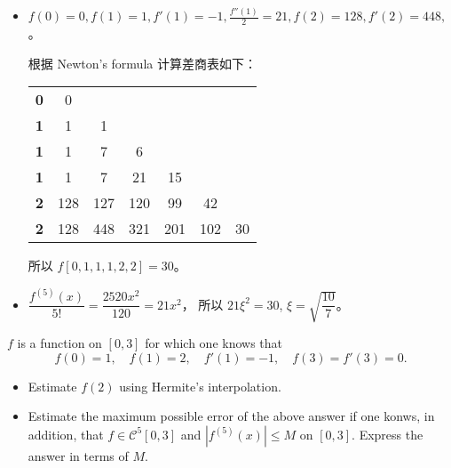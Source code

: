 \documentclass[lang=cn,a4paper,newtx,bibend=bibtex]{elegantpaper}
\begin{document}
\begin{solution}
  \begin{itemize}
  \item $f(0) = 0, f(1) = 1, f'(1) = -1, \frac{f''(1)}{2} = 21, f(2) = 128, f'(2) = 448,$。

  根据 Newton's formula 计算差商表如下：
  \begin{tabular}{c|cccccc}
     &  &  &  &  & & \\
    \hline
    \textbf{0} & 0 & & & & &\\
    \textbf{1} & 1 & 1 & & & & \\
    \textbf{1} & 1 & 7 & 6 & & &\\
    \textbf{1} & 1 & 7 & 21 & 15 & & \\
    \textbf{2} & 128 & 127 & 120 & 99 & 42 \\
    \textbf{2} & 128 & 448 & 321 & 201 & 102& 30  \\
    \end{tabular}
  
  
  所以  $f[0, 1, 1, 1, 2, 2]  = 30$。
  
  \item $\dfrac{f^{(5)}(x)}{5!} = \dfrac{2520x^2}{120} = 21x^2$， 所以 $21\xi^2 = 30$, $\xi = \sqrt{\dfrac{10}{7}}$。
  \end{itemize}
  \end{solution}

\begin{prob}[2.9.1-\textrm{VI}.]
    $f$ is a function on $[0,3]$ for which one knows that
    \begin{equation*}
      f(0)=1,\quad f(1)=2,\quad f'(1)=-1,\quad f(3)=f'(3)=0.
    \end{equation*}
    \begin{itemize}
      \item Estimate $f(2)$ using Hermite's interpolation.
      \item Estimate the maximum possible error of the above answer if one konws, in addition, that $f\in \mathcal{C}^5[0,3]$ and $|f^{(5)}(x)|\leq M$ on $[0,3]$. Express the answer in terms of $M$.
    \end{itemize}
\end{prob}
\end{document}
